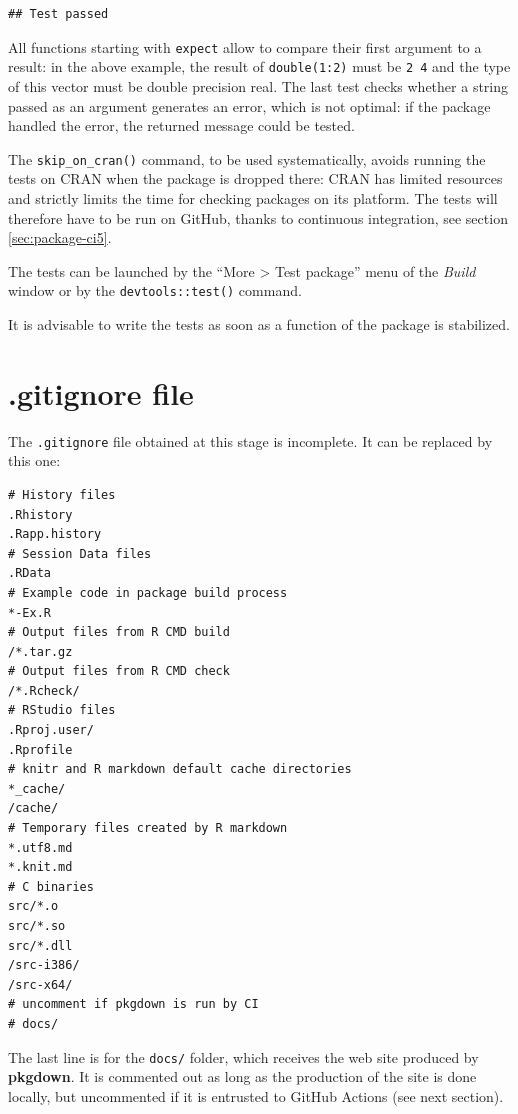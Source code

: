 \documentclass[
  12pt,
  american,
  a4paper,
  extrafontsizes,onecolumn,openright
  ]{memoir}
\begin{document}
\begin{verbatim}
## Test passed
\end{verbatim}

\normalsize

All functions starting with \texttt{expect} allow to compare their first argument to a result: in the above example, the result of \texttt{double(1:2)} must be \texttt{2\ 4} and the type of this vector must be double precision real.
The last test checks whether a string passed as an argument generates an error, which is not optimal: if the package handled the error, the returned message could be tested.

The \texttt{skip\_on\_cran()} command, to be used systematically, avoids running the tests on CRAN when the package is dropped there: CRAN has limited resources and strictly limits the time for checking packages on its platform.
The tests will therefore have to be run on GitHub, thanks to continuous integration, see section \ref{sec:package-ci5}.

The tests can be launched by the \enquote{More \textgreater{} Test package} menu of the \emph{Build} window or by the \texttt{devtools::test()} command.

It is advisable to write the tests as soon as a function of the package is stabilized.

\hypertarget{gitignore-file}{%
\section{.gitignore file}\label{gitignore-file}}

The \texttt{.gitignore} file obtained at this stage is incomplete.
It can be replaced by this one:

\begin{verbatim}
# History files
.Rhistory
.Rapp.history
# Session Data files
.RData
# Example code in package build process
*-Ex.R
# Output files from R CMD build
/*.tar.gz
# Output files from R CMD check
/*.Rcheck/
# RStudio files
.Rproj.user/
.Rprofile
# knitr and R markdown default cache directories
*_cache/
/cache/
# Temporary files created by R markdown
*.utf8.md
*.knit.md
# C binaries
src/*.o
src/*.so
src/*.dll
/src-i386/
/src-x64/
# uncomment if pkgdown is run by CI
# docs/
\end{verbatim}

The last line is for the \texttt{docs/} folder, which receives the web site produced by \textbf{pkgdown}.
It is commented out as long as the production of the site is done locally, but uncommented if it is entrusted to GitHub Actions (see next section).
\end{document}

